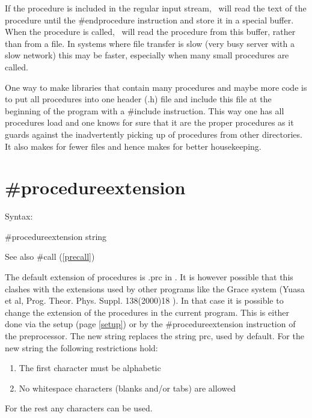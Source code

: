 If the procedure is included in the regular input stream, \FORM\ will read 
the text of the procedure until the \#endprocedure 
instruction and store it in a special buffer. When the procedure is called, 
\FORM\ will read the procedure from this buffer, rather than from a file. In 
systems where file transfer is slow (very busy server with a slow network) 
this may be faster, especially when many small procedures are called.

One way to make libraries that 
contain many procedures and maybe more code is to put all procedures into 
one header (.h) file and include this file at the beginning of the program 
with a \#include instruction. This way one has all 
procedures load and one knows for sure that it are the proper procedures as 
it guards against the inadvertently picking up of procedures from other 
directories. It also makes for fewer files and hence makes for better 
housekeeping.



\section{\#procedureextension}
\label{preprocedureextension}

\noindent Syntax:

\#procedureextension string
 
\noindent See also \#call (\ref{precall})

\noindent The default extension of procedures 
is .prc in \FORM\@. It is however possible that this clashes with 
the extensions used by other programs like the Grace system 
(Yuasa et al, Prog. Theor. Phys. Suppl. 138(2000)18 ). In that case it is 
possible to change the extension of the procedures in the current program. 
This is either done via the setup (page \ref{setup}) or by the 
\#procedureextension instruction of the preprocessor. The new string 
replaces the string prc, used by default. For the new string the following 
restrictions hold:
\begin{enumerate}
\item The first character must be alphabetic
\item No whitespace characters (blanks and/or tabs) are allowed
\end{enumerate}
For the rest any characters can be used.

